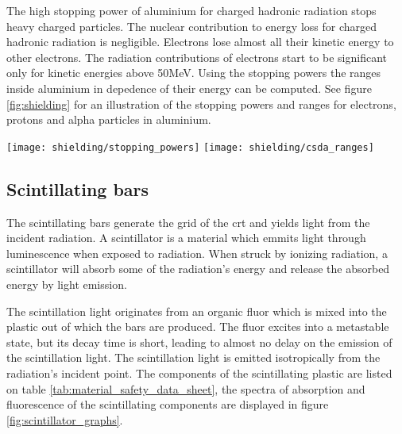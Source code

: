 The high stopping power of aluminium for charged hadronic radiation stops heavy charged particles.
The nuclear contribution to energy loss for charged hadronic radiation is negligible.
Electrons lose almost all their kinetic energy to other electrons.
The radiation contributions of electrons start to be significant only for kinetic energies above 50MeV.
Using the stopping powers the ranges inside aluminium in depedence of their energy can be computed.
See figure \ref{fig:shielding} for an illustration of the stopping powers and ranges for electrons, protons and alpha particles in aluminium.

\begin{figure*}
  \centering
  \texttt{[image: shielding/stopping\_powers]}
  \texttt{[image: shielding/csda\_ranges]}
  \caption{%
    The stopping powers (left) and \gls{csda} ranges (right) are displayed for electrons (green), protons (blue) and alpha particles (orange).
    The radiative energy losses for electrons and nuclear contributions for the hadros are dashed.
    Data source: \href{http://physics.nist.gov/PhysRefData/Star/Text/ESTAR.html}{NIST ESTAR},
                 \href{http://physics.nist.gov/PhysRefData/Star/Text/PSTAR.html}{NIST PSTAR} \&
                 \href{http://physics.nist.gov/PhysRefData/Star/Text/ASTAR.html}{NIST ASTAR}
  }
  \label{fig:shielding}
\end{figure*}

\subsection{Scintillating bars}
The scintillating bars generate the grid of the \gls{crt} and yields light from the incident radiation.
A scintillator is a material which emmits light through luminescence when exposed to radiation.
When struck by ionizing radiation, a scintillator will absorb some of the radiation's energy and release the absorbed energy by light emission.

The scintillation light originates from an organic fluor which is mixed into the plastic out of which the bars are produced.
The fluor excites into a metastable state, but its decay time is short, leading to almost no delay on the emission of the scintillation light.
The scintillation light is emitted isotropically from the radiation's incident point.
The components of the scintillating plastic are listed on table \ref{tab:material_safety_data_sheet}, the spectra of absorption and fluorescence of the scintillating components are displayed in figure \ref{fig:scintillator_graphs}.

